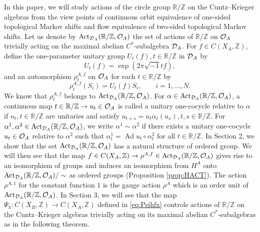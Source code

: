 \documentclass[11pt]{article}
\theoremstyle{plain}
\theoremstyle{definition}
\numberwithin{equation}{section}
\newcommand{\Ad}{\operatorname{Ad}}
\newcommand{\RZ}{\mathbb{R}/{\mathbb{Z}}}
\newcommand{\Z}{\mathbb{Z}}
\begin{document}
In this paper, we will study actions of  the circle group 
$\RZ$ on the Cuntz--Krieger algebras 
from the view points of 
continuous orbit equivalence of one-sided topological Markov shifts 
and
flow equivalence of two-sided topological Markov shifts.
Let us denote by ${{\operatorname{Act}_{{{\mathcal{D}}_A}}(\mathbb{R}/{\mathbb{Z}},{{\mathcal{O}}_A})}}$ 
the set of actions of 
${\RZ}$ on ${{\mathcal{O}}_A}$  
 trivially acting on the maximal abelian $C^*$-subalgebra 
${{\mathcal{D}}_A}$.
For $f \in C(X_A, \Z)$,
define the one-parameter unitary group
$U_t(f), t \in \RZ$ in ${{\mathcal{D}}_A}$
by 
\begin{equation}
U_t(f) = \exp({2\pi \sqrt{-1} t f}), \label{eq:utf}
\end{equation}
and an automorphism
$\rho_t^{A,f}$ on ${{\mathcal{O}}_A}$ for each $t \in \RZ$ 
by 
\begin{equation}
\rho_t^{A,f}(S_i) = U_t(f) S_i, \qquad i=1,\dots,N. \label{eq:rhotf}
\end{equation}
We know that 
$\rho_t^{A,f}$ belongs to
${{\operatorname{Act}_{{{\mathcal{D}}_A}}(\mathbb{R}/{\mathbb{Z}},{{\mathcal{O}}_A})}}$.
For $\alpha \in {{\operatorname{Act}_{{{\mathcal{D}}_A}}(\mathbb{R}/{\mathbb{Z}},{{\mathcal{O}}_A})}}$,
a continuous map
$t \in \RZ \rightarrow u_t \in \OA$
is called a unitary one-cocycle relative to $\alpha$ 
if $u_t, t \in \RZ$ are unitaries
and satisfy 
$u_{t+s} = u_t \alpha_t(u_s), t,s \in \RZ$. 
For
$\alpha^1, \alpha^2 \in {{\operatorname{Act}_{{{\mathcal{D}}_A}}(\mathbb{R}/{\mathbb{Z}},{{\mathcal{O}}_A})}}$,
we write
$\alpha^1\sim \alpha^2$
if there exists a unitary one-cocycle 
$u_t \in {{\mathcal{O}}_A}$ relative to 
$\alpha^2$ 
such that
$\alpha^1_t = \Ad u_t \circ \alpha^2_t$
for all $t \in \RZ$.
In Section 2, 
we show that the set ${{\operatorname{Act}_{{{\mathcal{D}}_A}}(\mathbb{R}/{\mathbb{Z}},{{\mathcal{O}}_A})}}$ has a natural structure of ordered group.
We will then see that
the map
$f \in C(X_A,\Z) \rightarrow \rho^{A,f} \in \ActA$
gives rise to an isomorphism of groups and induces
an isomorphism
from $H^A$ onto ${{\operatorname{Act}_{{{\mathcal{D}}_A}}(\mathbb{R}/{\mathbb{Z}},{{\mathcal{O}}_A})}}/\sim$ as ordered groups
(Proposition \ref{prop:HACT}).
The action $\rho^{A,1}$ for the constant function $1$
is the gauge action $\rho^A$
which is an order unit of ${{\operatorname{Act}_{{{\mathcal{D}}_A}}(\mathbb{R}/{\mathbb{Z}},{{\mathcal{O}}_A})}}$.
In Section 3,
we will see that 
the map
$\Psi_h:C(X_B,\Z) \rightarrow C(X_A,\Z)$
defined in 
\eqref{eq:Psihfx}
controls actions of $\RZ$ on the Cuntz--Krieger algebras
trivially acting  on its maximal abelian $C^*$-subalgebras
as in the following theorem.
\end{document}
